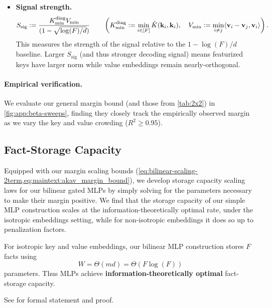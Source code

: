 \begin{itemize}[leftmargin=0.5cm]
    \item \textbf{Signal strength.}
    \[
    S_{\mathrm{sig}}
    \vcentcolon=
    \frac{K_{\min}^{\mathrm{diag}}V_{\min}}{(1-\sqrt{\log(F)/d})}
    \qquad
    \left(
    K_{\min}^{\mathrm{diag}}
    \vcentcolon=
    \min_{i\in[F]}\hat{K}({\mathbf{k}}_i, {\mathbf{k}}_i),
    \quad
    V_{\min}
    \vcentcolon=
    \min_{i\neq j}
    \langle {\mathbf{v}}_i-{\mathbf{v}}_j,{\mathbf{v}}_i\rangle
    \right).
    \]
    This measures the strength of the signal relative to the $1-\log(F)/d$ baseline.
    Larger $S_{\mathrm{sig}}$ (and thus stronger decoding signal) means featurized keys have larger norm while value embeddings remain nearly-orthogonal.
\end{itemize}









\paragraph{Empirical verification.} We evaluate our general margin bound (and those from \cref{tab:2x2}) in \cref{fig:app:beta-sweeps}, finding they closely track the empirically observed margin as we vary the key and value crowding ($R^2 \geq 0.95$).


\subsection{Fact-Storage Capacity}
\label{sec:fact-storage-capacity}

Equipped with our margin scaling bounds (\cref{eq:bilinear-scaling-2term,eq:maintext:akav_margin_bound}), we develop storage capacity scaling laws for our bilinear gated MLPs by simply solving for the parameters necessary to make their margin positive.
We find that the storage capacity of our simple MLP construction scales at the information-theoretically optimal rate, under the isotropic embeddings setting, while for non-isotropic embeddings it does so up to penalization factors.

\begin{tcolorbox}[breakable,colback=white,colframe=blue!50!black,boxrule=1.5pt,arc=0mm,left=8pt,right=8pt,top=8pt,bottom=8pt,title={\small\bfseries Key Result: MLPs store facts at an info-theoretically optimal rate.},colbacktitle=blue!50!black,coltitle=white,titlerule=0.5pt]
\begin{corollary}\label{cor:optimal-fact-storage-capacity}
For isotropic key and value embeddings, our bilinear MLP construction stores $F$ facts using
\[
W = \Theta(md) = \Theta\!\left(F\log(F)\right)
\]
parameters.
Thus MLPs achieve \textbf{information-theoretically optimal} fact-storage capacity.
\end{corollary}
See  for formal statement and proof.
\end{tcolorbox}

